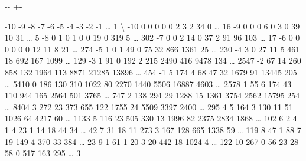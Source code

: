 \documentclass[letterpaper,10pt,english]{sphinxmanual}
\newlength\nbsphinxcodecellspacing
\begin{document}
{
\begin{sphinxVerbatim}[commandchars=\\\{\}]
\llap{\color{nbsphinxin}[73]:\,\hspace{\fboxrule}\hspace{\fboxsep}}\PYG{p}{[} \PYG{p}{]}
\end{sphinxVerbatim}
}

{

\kern-\sphinxverbatimsmallskipamount\kern-\baselineskip
\kern+\FrameHeightAdjust\kern-\fboxrule
\vspace{\nbsphinxcodecellspacing}

\begin{sphinxVerbatim}[commandchars=\\\{\}]
\llap{\color{nbsphinxout}[73]:\,\hspace{\fboxrule}\hspace{\fboxsep}}     -10  -9   -8    -7   -6    -5    -4    -3     -2     -1   {\ldots}    1   \textbackslash{}
-10    0    0    0     0    0     2     3     2     34      0  {\ldots}    16
-9     0    0    0     6    0     3     0    39     10     31  {\ldots}     5
-8     0    1    0     1    0     0    19     0    319      5  {\ldots}   302
-7     0    0    2    14    0    37     2    91     96    103  {\ldots}    17
-6     0    0    0     0    0     0    12    11      8     21  {\ldots}   274
-5     1    0    1    49    0    75    32   866   1361     25  {\ldots}   230
-4     3    0   27    11    5   461    18   692    167   1099  {\ldots}   129
-3     1   91    0   192    2   215  2490   416   9478    134  {\ldots}  2547
-2    67   14  260   858  132  1964   113  8871  21285  13896  {\ldots}   454
-1     5  174    4    68   47    32  1679    91  13445    205  {\ldots}  5410
 0   186  130  310  1022   80  2270  1440  5506  16887   4603  {\ldots}  2578
 1    55    6  174    43  110   944   165  2564    501   3765  {\ldots}   747
 2   138  294   29  1288   15  1361  3754  2562  15795    254  {\ldots}  8404
 3   272   23  373   655  122  1755    24  5509   3397   2400  {\ldots}   295
 4     5  164    3   130   11    51  1026    64   4217     60  {\ldots}  1133
 5   116   23  505   330   13  1996    82  2375   2834   1868  {\ldots}   102
 6     2    4    1     4   23     1    14    18     44     34  {\ldots}    42
 7    31   18   11   273    3   167   128   665   1338     59  {\ldots}   119
 8    47    1   88     7   19   149     4   370     33    384  {\ldots}    23
 9     1   61    1    20    3    20   442    18   1024      4  {\ldots}   122
 10  267    0   56    23   28    58     0   517    163    295  {\ldots}     3


\end{sphinxVerbatim}}
\end{document}
